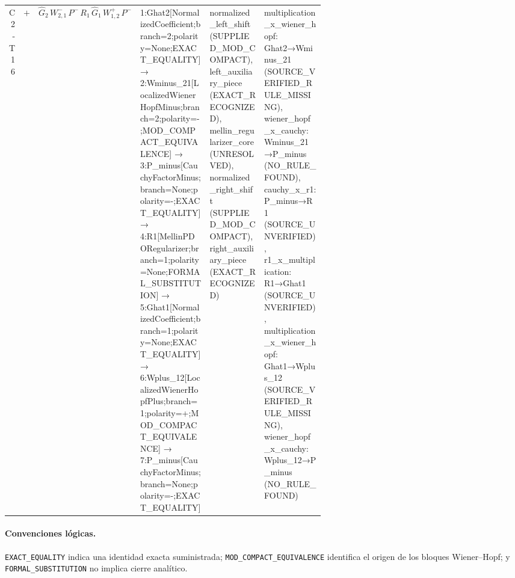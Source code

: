 \begin{longtable}{@{}rclp{0.23\linewidth}p{0.18\linewidth}p{0.20\linewidth}@{}}
C2-T16 & $+$ & $\widehat G_{2}\,W^-_{2,1}\,P^{-}\,R_{1}\,\widehat G_{1}\,W^+_{1,2}\,P^{-}$ & 1:Ghat2[NormalizedCoefficient;branch=2;polarity=None;EXACT\_EQUALITY] → 2:Wminus\_21[LocalizedWienerHopfMinus;branch=2;polarity=-;MOD\_COMPACT\_EQUIVALENCE] → 3:P\_minus[CauchyFactorMinus;branch=None;polarity=-;EXACT\_EQUALITY] → 4:R1[MellinPDORegularizer;branch=1;polarity=None;FORMAL\_SUBSTITUTION] → 5:Ghat1[NormalizedCoefficient;branch=1;polarity=None;EXACT\_EQUALITY] → 6:Wplus\_12[LocalizedWienerHopfPlus;branch=1;polarity=+;MOD\_COMPACT\_EQUIVALENCE] → 7:P\_minus[CauchyFactorMinus;branch=None;polarity=-;EXACT\_EQUALITY] & normalized\_left\_shift (SUPPLIED\_MOD\_COMPACT), left\_auxiliary\_piece (EXACT\_RECOGNIZED), mellin\_regularizer\_core (UNRESOLVED), normalized\_right\_shift (SUPPLIED\_MOD\_COMPACT), right\_auxiliary\_piece (EXACT\_RECOGNIZED) & multiplication\_x\_wiener\_hopf: Ghat2→Wminus\_21 (SOURCE\_VERIFIED\_RULE\_MISSING), wiener\_hopf\_x\_cauchy: Wminus\_21→P\_minus (NO\_RULE\_FOUND), cauchy\_x\_r1: P\_minus→R1 (SOURCE\_UNVERIFIED), r1\_x\_multiplication: R1→Ghat1 (SOURCE\_UNVERIFIED), multiplication\_x\_wiener\_hopf: Ghat1→Wplus\_12 (SOURCE\_VERIFIED\_RULE\_MISSING), wiener\_hopf\_x\_cauchy: Wplus\_12→P\_minus (NO\_RULE\_FOUND) \\
\end{longtable}

\paragraph{Convenciones lógicas.}
\texttt{EXACT\_EQUALITY} indica una identidad exacta suministrada;
\texttt{MOD\_COMPACT\_EQUIVALENCE} identifica el origen de los bloques
Wiener--Hopf; y \texttt{FORMAL\_SUBSTITUTION} no implica cierre analítico.
